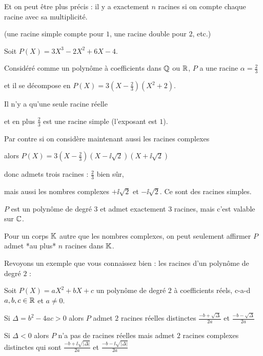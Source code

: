 \change

Et on peut être plus précis : il y a exactement $n$ racines 
si on compte chaque racine
avec sa multiplicité.

(une racine simple compte pour $1$, une racine double pour $2$, etc.)




\change

Soit $P(X)=3X^3-2X^2+6X-4$.


\change

Considéré comme un polynôme à coefficients dans $\mathbb{Q}$ ou $\mathbb{R}$,
$P$ a une racine  $\alpha = \frac23$

\change

et il se décompose en
$P(X)=3(X-\frac23)(X^2+2)$.

Il n'y a qu'une seule racine réelle

et en plus $\frac23$ est une racine simple (l'exposant est $1$).

\change

Par contre si on considère maintenant aussi les racines complexes

\change

alors $P(X)=3(X-\frac23)(X-\ii\sqrt2)(X+\ii\sqrt2)$

donc admets trois racines : $\frac23$ bien sûr,

mais aussi les nombres complexes $+ \ii \sqrt 2$ et $- \ii \sqrt 2$.
Ce sont des racines simples.

$P$ est un polynôme de degré $3$ et admet exactement $3$ racines, mais c'est valable sur $\mathbb{C}$.


Pour un corps $\mathbb{K}$ autre que les nombres complexes,
on peut seulement affirmer 
$P$ admet *au plus* $n$ racines dans $\mathbb{K}$.

 

\diapo

Revoyons un exemple que vous connaissez bien : 
les racines d'un polynôme de degré $2$ :

Soit $P(X)=aX^2+bX+c$ un polynôme de degré $2$ à coefficients réels,
c-a-d $a,b,c \in \mathbb{R}$ et $a\neq 0$.


\change

Si $\Delta = b^2-4ac > 0$ alors $P$ admet $2$ racines réelles distinctes $\frac{-b+\sqrt{\Delta}}{2a}$
et $\frac{-b-\sqrt{\Delta}}{2a}$

\change

Si $\Delta < 0$ alors $P$ n'a pas de racines réelles mais admet $2$ racines complexes distinctes qui sont
$\frac{-b+\ii\sqrt{|\Delta|}}{2a}$
et $\frac{-b-\ii\sqrt{|\Delta|}}{2a}$

